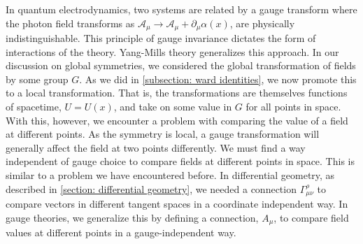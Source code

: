 In quantum electrodynamics, two systems are related by a gauge transform where the photon field transforms as $\mathcal A_\mu \rightarrow \mathcal A_\mu + \partial_\mu \alpha(x)$, are physically indistinguishable.
This principle of gauge invariance dictates the form of interactions of the theory.
Yang-Mills theory generalizes this approach.
In our discussion on global symmetries, we considered the global transformation of fields by some group $G$.
As we did in \autoref{subsection: ward identities}, we now promote this to a local transformation.
That is, the transformations are themselves functions of spacetime, $U = U(x)$, and take on some value in $G$ for all points in space.
With this, however, we encounter a problem with comparing the value of a field at different points.
As the symmetry is local, a gauge transformation will generally affect the field at two points differently.
We must find a way independent of gauge choice to compare fields at different points in space.
This is similar to a problem we have encountered before.
In differential geometry, as described in \autoref{section: differential geometry}, we needed a connection $\Gamma^\rho_{\mu \nu}$ to compare vectors in different tangent spaces in a coordinate independent way.
In gauge theories, we generalize this by defining a connection, $A_\mu$, to compare field values at different points in a gauge-independent way.

